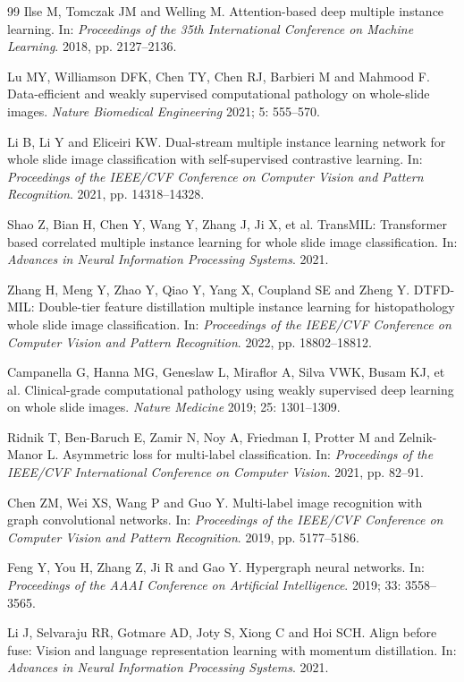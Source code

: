 \documentclass[Afour,sagev,times]{sagej}
\begin{document}
\begin{thebibliography}{99}
Ilse M, Tomczak JM and Welling M. Attention-based deep multiple instance learning. In: \textit{Proceedings of the 35th International Conference on Machine Learning}. 2018, pp. 2127--2136.

Lu MY, Williamson DFK, Chen TY, Chen RJ, Barbieri M and Mahmood F. Data-efficient and weakly supervised computational pathology on whole-slide images. \textit{Nature Biomedical Engineering} 2021; 5: 555--570.

Li B, Li Y and Eliceiri KW. Dual-stream multiple instance learning network for whole slide image classification with self-supervised contrastive learning. In: \textit{Proceedings of the IEEE/CVF Conference on Computer Vision and Pattern Recognition}. 2021, pp. 14318--14328.

Shao Z, Bian H, Chen Y, Wang Y, Zhang J, Ji X, et al. TransMIL: Transformer based correlated multiple instance learning for whole slide image classification. In: \textit{Advances in Neural Information Processing Systems}. 2021.

Zhang H, Meng Y, Zhao Y, Qiao Y, Yang X, Coupland SE and Zheng Y. DTFD-MIL: Double-tier feature distillation multiple instance learning for histopathology whole slide image classification. In: \textit{Proceedings of the IEEE/CVF Conference on Computer Vision and Pattern Recognition}. 2022, pp. 18802--18812.

Campanella G, Hanna MG, Geneslaw L, Miraflor A, Silva VWK, Busam KJ, et al. Clinical-grade computational pathology using weakly supervised deep learning on whole slide images. \textit{Nature Medicine} 2019; 25: 1301--1309.

Ridnik T, Ben-Baruch E, Zamir N, Noy A, Friedman I, Protter M and Zelnik-Manor L. Asymmetric loss for multi-label classification. In: \textit{Proceedings of the IEEE/CVF International Conference on Computer Vision}. 2021, pp. 82--91.

Chen ZM, Wei XS, Wang P and Guo Y. Multi-label image recognition with graph convolutional networks. In: \textit{Proceedings of the IEEE/CVF Conference on Computer Vision and Pattern Recognition}. 2019, pp. 5177--5186.

Feng Y, You H, Zhang Z, Ji R and Gao Y. Hypergraph neural networks. In: \textit{Proceedings of the AAAI Conference on Artificial Intelligence}. 2019; 33: 3558--3565.

Li J, Selvaraju RR, Gotmare AD, Joty S, Xiong C and Hoi SCH. Align before fuse: Vision and language representation learning with momentum distillation. In: \textit{Advances in Neural Information Processing Systems}. 2021.


\end{thebibliography}
\end{document}
